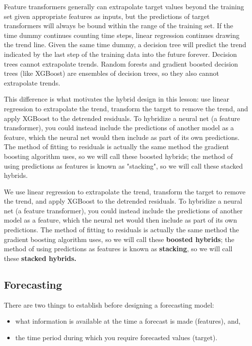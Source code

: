 \documentclass[12pt]{report}
\begin{document}
Feature transformers generally can extrapolate target values beyond the training set given appropriate features as inputs, but the predictions of target transformers will always be bound within the range of the training set. If the time dummy continues counting time steps, linear regression continues drawing the trend line. Given the same time dummy, a decision tree will predict the trend indicated by the last step of the training data into the future forever. Decision trees cannot extrapolate trends. Random forests and gradient boosted decision trees (like XGBoost) are ensembles of decision trees, so they also cannot extrapolate trends.

This difference is what motivates the hybrid design in this lesson: use linear regression to extrapolate the trend, transform the target to remove the trend, and apply XGBoost to the detrended residuals. To hybridize a neural net (a feature transformer), you could instead include the predictions of another model as a feature, which the neural net would then include as part of its own predictions. The method of fitting to residuals is actually the same method the gradient boosting algorithm uses, so we will call these boosted hybrids; the method of using predictions as features is known as "stacking", so we will call these stacked hybrids.


We use linear regression to extrapolate the trend, transform the target to remove the trend, and apply XGBoost to the detrended residuals. To hybridize a neural net (a feature transformer), you could instead include the predictions of another model as a feature, which the neural net would then include as part of its own predictions. The method of fitting to residuals is actually the same method the gradient boosting algorithm uses, so we will call these \textbf{boosted hybrids}; the method of using predictions as features is known as \textbf{stacking}, so we will call these \textbf{stacked hybrids.}


\subsection{Forecasting}

There are two things to establish before designing a forecasting model:
\begin{itemize}
  \item what information is available at the time a forecast is made (features), and,
  \item the time period during which you require forecasted values (target).
\end{itemize}
\end{document}

